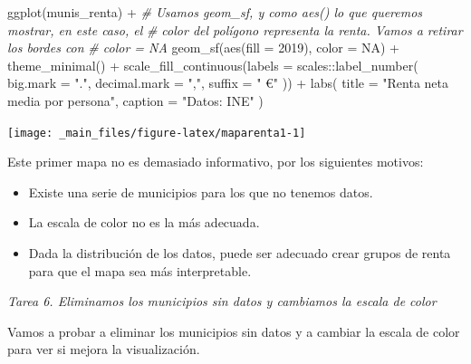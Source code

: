 \documentclass[
]{report}
\newenvironment{Shaded}{\begin{snugshade}}{\end{snugshade}}
\newcommand{\AttributeTok}[1]{\textcolor[rgb]{0.77,0.63,0.00}{#1}}
\newcommand{\CommentTok}[1]{\textcolor[rgb]{0.56,0.35,0.01}{\textit{#1}}}
\newcommand{\ConstantTok}[1]{\textcolor[rgb]{0.00,0.00,0.00}{#1}}
\newcommand{\FunctionTok}[1]{\textcolor[rgb]{0.00,0.00,0.00}{#1}}
\newcommand{\NormalTok}[1]{#1}
\newcommand{\SpecialCharTok}[1]{\textcolor[rgb]{0.00,0.00,0.00}{#1}}
\newcommand{\StringTok}[1]{\textcolor[rgb]{0.31,0.60,0.02}{#1}}
\theoremstyle{definition}
\theoremstyle{definition}
\theoremstyle{definition}
\theoremstyle{definition}
\theoremstyle{remark}
\begin{document}
\begin{Shaded}
\begin{Highlighting}[]

\FunctionTok{ggplot}\NormalTok{(munis\_renta) }\SpecialCharTok{+}
  \CommentTok{\# Usamos geom\_sf, y como aes() lo que queremos mostrar, en este caso, el}
  \CommentTok{\# color del polígono representa la renta. Vamos a retirar los bordes con}
  \CommentTok{\# color = NA}
  \FunctionTok{geom\_sf}\NormalTok{(}\FunctionTok{aes}\NormalTok{(}\AttributeTok{fill =} \StringTok{\textasciigrave{}}\AttributeTok{2019}\StringTok{\textasciigrave{}}\NormalTok{), }\AttributeTok{color =} \ConstantTok{NA}\NormalTok{) }\SpecialCharTok{+}
  \FunctionTok{theme\_minimal}\NormalTok{() }\SpecialCharTok{+}
  \FunctionTok{scale\_fill\_continuous}\NormalTok{(}\AttributeTok{labels =}\NormalTok{ scales}\SpecialCharTok{::}\FunctionTok{label\_number}\NormalTok{(}
    \AttributeTok{big.mark =} \StringTok{"."}\NormalTok{,}
    \AttributeTok{decimal.mark =} \StringTok{","}\NormalTok{,}
    \AttributeTok{suffix =} \StringTok{" €"}
\NormalTok{  )) }\SpecialCharTok{+}
  \FunctionTok{labs}\NormalTok{(}
    \AttributeTok{title =} \StringTok{"Renta neta media por persona"}\NormalTok{,}
    \AttributeTok{caption =} \StringTok{"Datos: INE"}
\NormalTok{  )}
\end{Highlighting}
\end{Shaded}

\begin{center}\texttt{[image: \_main\_files/figure-latex/maparenta1-1]} \end{center}

Este primer mapa no es demasiado informativo, por los siguientes motivos:

\begin{itemize}
\item
  Existe una serie de municipios para los que no tenemos datos.
\item
  La escala de color no es la más adecuada.
\item
  Dada la distribución de los datos, puede ser adecuado crear grupos de renta
  para que el mapa sea más interpretable.
\end{itemize}

\emph{Tarea 6. Eliminamos los municipios sin datos y cambiamos la escala de color}

Vamos a probar a eliminar los municipios sin datos y a cambiar la escala de
color para ver si mejora la visualización.
\end{document}
